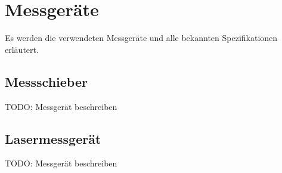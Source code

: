\section{Messgeräte}\label{anhang:messung:messgeraete}
Es werden die verwendeten Messgeräte und alle bekannten Spezifikationen erläutert.

\subsection{Messschieber}
TODO: Messgerät beschreiben

\subsection{Lasermessgerät}
TODO: Messgerät beschreiben